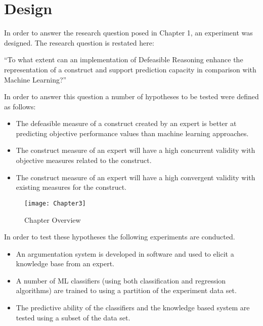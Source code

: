 \chapter{Design} %

\label{Chapter3} %



In order to answer the research question posed in Chapter 1, an experiment was designed. The research question is restated here:

``To what extent can an implementation of Defeasible Reasoning enhance the representation of a construct and support prediction capacity in comparison with Machine Learning?''

In order to answer this question a number of hypotheses to be tested were defined as follows:

\begin{itemize}
  \item The defeasible measure of a construct created by an expert is better at predicting objective performance values than machine learning approaches.
  \item The construct measure of an expert will have a high concurrent validity with objective measures related to the construct.
  \item The construct measure of an expert will have a high convergent validity with existing measures for the construct.
\end{itemize}

\begin{figure}[!h]
\centering
\texttt{[image: Chapter3]}
\caption{Chapter Overview}
\label{fig:chapter_overview}
\end{figure}

In order to test these hypotheses the following experiments are conducted.

\begin{itemize}

  \item An argumentation system is developed in software and used to elicit a knowledge base from an expert.
  \item A number of ML classifiers (using both classification and regression algorithms) are trained to using a partition of the experiment data set.
  \item The predictive ability of the classifiers and the knowledge based system are tested using a subset of the data set.

\end{itemize}

